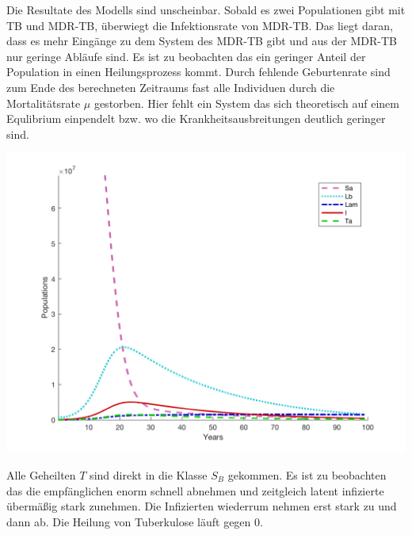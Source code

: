 \documentclass[paper=a4, fontsize=11pt, ngerman, abstract=on]{scrartcl}
\numberwithin{equation}{section} %
\numberwithin{figure}{section} %
\numberwithin{table}{section} %
\begin{document}
Die Resultate des Modells sind unscheinbar. Sobald es zwei Populationen gibt mit TB und MDR-TB, überwiegt die Infektionsrate von MDR-TB.
Das liegt daran, dass es mehr Eingänge zu dem System des MDR-TB gibt und aus der MDR-TB nur geringe Abläufe sind. Es ist zu beobachten das ein geringer Anteil der Population in einen Heilungsprozess kommt. Durch fehlende Geburtenrate sind zum Ende des berechneten Zeitraums fast alle Individuen durch die Mortalitätsrate $\mu$ gestorben. Hier fehlt ein System das sich theoretisch auf einem Equlibrium einpendelt bzw. wo die Krankheitsausbreitungen deutlich geringer sind.

\begin{minipage}{0.6\linewidth}
  \includegraphics[width=\linewidth]{images/mdr_tb_1}
  \label{fig:mdr-tb-1}
\end{minipage}\hfill
\begin{minipage}{0.4\linewidth}
  Alle Geheilten $T$ sind direkt in die Klasse $S_{B}$ gekommen. Es ist zu beobachten das die empfänglichen enorm schnell abnehmen und zeitgleich latent infizierte übermäßig stark zunehmen. Die Infizierten wiederrum nehmen erst stark zu und dann ab. Die Heilung von Tuberkulose läuft gegen 0.
\end{minipage}\\\\
\end{document}
